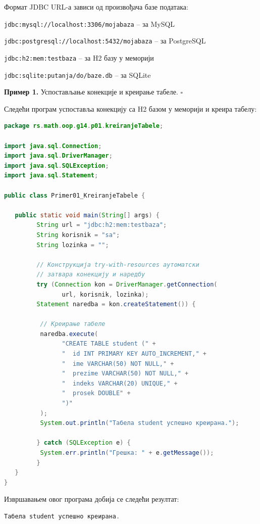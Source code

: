 Формат JDBC URL-а зависи од произвођача базе података:

\texttt{jdbc:mysql://localhost:3306/mojabaza} – за MySQL

\texttt{jdbc:postgresql://localhost:5432/mojabaza} – за PostgreSQL

\texttt{jdbc:h2:mem:testbaza} – за H2 базу у меморији

\texttt{jdbc:sqlite:putanja/do/baze.db} – за SQLite


\bigskip

\noindent \textbf{Пример 1.} Успостављање конекције и креирање табеле. $\square$

\medskip

Следећи програм успоставља конекцију са H2 базом у меморији и креира табелу:


\begin{lstlisting}[language=Java]
package rs.math.oop.g14.p01.kreiranjeTabele;
 
import java.sql.Connection;
import java.sql.DriverManager;
import java.sql.SQLException;
import java.sql.Statement;
 
public class Primer01_KreiranjeTabele {
 
   public static void main(String[] args) {
         String url = "jdbc:h2:mem:testbaza";
         String korisnik = "sa";
         String lozinka = "";
 
         // Конструкција try-with-resources аутоматски
         // затвара конекцију и наредбу
         try (Connection kon = DriverManager.getConnection(
                url, korisnik, lozinka);
         Statement naredba = kon.createStatement()) {
 
          // Креирање табеле
          naredba.execute(
                "CREATE TABLE student (" +
                "  id INT PRIMARY KEY AUTO_INCREMENT," +
                "  ime VARCHAR(50) NOT NULL," +
                "  prezime VARCHAR(50) NOT NULL," +
                "  indeks VARCHAR(20) UNIQUE," +
                "  prosek DOUBLE" +
                ")"
          );
          System.out.println("Табела student успешно креирана.");
 
         } catch (SQLException e) {
          System.err.println("Грешка: " + e.getMessage());
         }
   }
}
\end{lstlisting}


Извршавањем овог програма добија се следећи резултат:


\begin{lstlisting}[language=Java]
Табела student успешно креирана.
\end{lstlisting}


